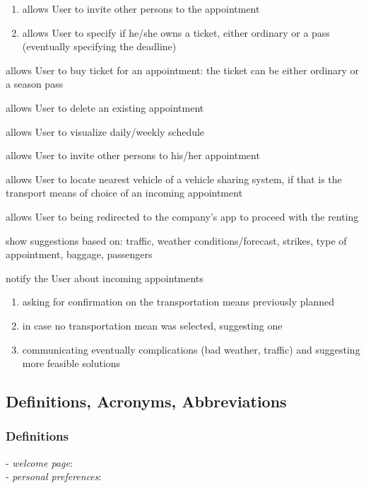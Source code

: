 \begin{enumerate}[label={[G\arabic*]}]
\begin{enumerate}[label=\theenumi\#{\arabic*}]
			\item allows User to invite other persons to the appointment
			\item allows User to specify if he/she owns a ticket, either ordinary or a pass (eventually specifying the deadline)
		\end{enumerate}
		\item allows User to buy ticket for an appointment: the ticket can be either ordinary or a season pass
		\item allows User to delete an existing appointment
		\item allows User to visualize daily/weekly schedule
		\item allows User to invite other persons to his/her appointment
		\item allows User to locate nearest vehicle of a vehicle sharing system, if that is the transport means of choice of an incoming appointment
			\item allows User to being redirected to the company's app to proceed with the renting

		\item show suggestions based on: traffic, weather conditions/forecast, strikes, type of appointment, baggage, passengers
		\item notify the User about incoming appointments
		\begin{enumerate}[label=\theenumi\#{\arabic*}]
			\item asking for confirmation on the transportation means previously planned
			\item in case no transportation mean was selected, suggesting one
			\item communicating eventually complications (bad weather, traffic) and suggesting more feasible solutions
		\end{enumerate}
	\end{enumerate}

\subsection{Definitions, Acronyms, Abbreviations}
	\subsubsection{Definitions}
		\begin{description}
			\item[- \textit{welcome page}:] %
			\item[- \textit{personal preferences}:] %
		\end{description}
